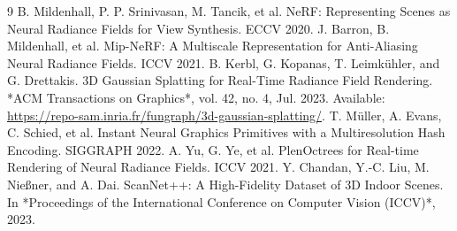 \documentclass[10pt,letterpaper]{article}
\begin{document}
	
	\begin{thebibliography}{9}
		 B. Mildenhall, P. P. Srinivasan, M. Tancik, et al. NeRF: Representing Scenes as Neural Radiance Fields for View Synthesis. ECCV 2020.
		 J. Barron, B. Mildenhall, et al. Mip-NeRF: A Multiscale Representation for Anti-Aliasing Neural Radiance Fields. ICCV 2021.
		 B. Kerbl, G. Kopanas, T. Leimkühler, and G. Drettakis. 3D Gaussian Splatting for Real-Time Radiance Field Rendering. *ACM Transactions on Graphics*, vol. 42, no. 4, Jul. 2023. Available: \url{https://repo-sam.inria.fr/fungraph/3d-gaussian-splatting/}.
		 T. Müller, A. Evans, C. Schied, et al. Instant Neural Graphics Primitives with a Multiresolution Hash Encoding. SIGGRAPH 2022.
		 A. Yu, G. Ye, et al. PlenOctrees for Real-time Rendering of Neural Radiance Fields. ICCV 2021.
		 Y. Chandan, Y.-C. Liu, M. Nießner, and A. Dai. ScanNet++: A High-Fidelity Dataset of 3D Indoor Scenes. In *Proceedings of the International Conference on Computer Vision (ICCV)*, 2023.
		
	\end{thebibliography}
	
\end{document}
